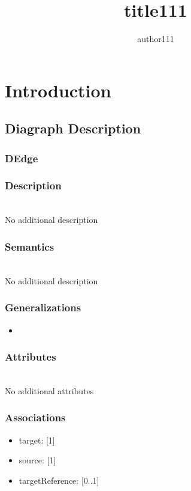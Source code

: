 \documentclass{article}
\begin{document}
\author{author111}
\title{title111}
\maketitle

\section{Introduction}\label{Introduction}

\subsection{Diagraph Description}\label{diagraph_Description}

\subsubsection{DEdge}\label{DEdge} 
\subsubsection*{Description} ~\\ No additional description
\subsubsection*{Semantics} ~\\ No additional description
\subsubsection*{Generalizations}
\begin{itemize}
\item {}
\end{itemize}
\subsubsection*{Attributes} ~\\ No additional attributes
\subsubsection*{Associations}
\begin{itemize}
\item target:  [1] 
\item source:  [1] 
\item targetReference:  [0..1] 
\end{itemize}
\end{document}
